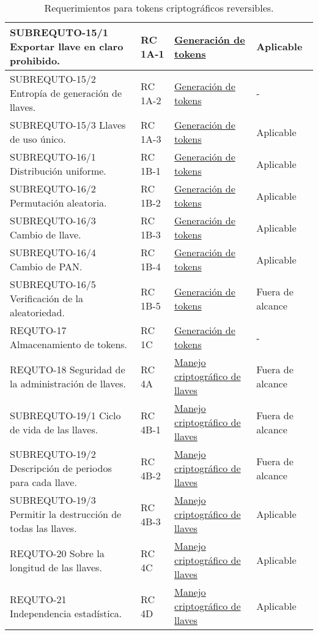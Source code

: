 \begin{table}[H]
\begin{tabular}{| p{5.5cm} | p{2cm} | p{4cm} | p{4cm} |}
    SUBREQUTO-15/1 Exportar llave en claro prohibido.  
    &  RC 1A-1  &  \hyperref[dm:gen_tokens]{Generación de tokens}              &  Aplicable        \\ \hline
    SUBREQUTO-15/2 Entropía de generación de llaves.  
    &  RC 1A-2  &  \hyperref[dm:gen_tokens]{Generación de tokens}              &  -                \\ \hline
    SUBREQUTO-15/3 Llaves de uso único.  
    &  RC 1A-3  &  \hyperref[dm:gen_tokens]{Generación de tokens}              &  Aplicable        \\ \hline
    SUBREQUTO-16/1 Distribución uniforme.  
    &  RC 1B-1  &  \hyperref[dm:gen_tokens]{Generación de tokens}              &  Aplicable        \\ \hline
    SUBREQUTO-16/2 Permutación aleatoria.  
    &  RC 1B-2  &  \hyperref[dm:gen_tokens]{Generación de tokens}              &  Aplicable        \\ \hline
    SUBREQUTO-16/3 Cambio de llave.  
    &  RC 1B-3  &  \hyperref[dm:gen_tokens]{Generación de tokens}              &  Aplicable        \\ \hline
    SUBREQUTO-16/4 Cambio de PAN.  
    &  RC 1B-4  &  \hyperref[dm:gen_tokens]{Generación de tokens}              &  Aplicable        \\ \hline
    SUBREQUTO-16/5 Verificación de la aleatoriedad.  
    &  RC 1B-5  &  \hyperref[dm:gen_tokens]{Generación de tokens}              &  Fuera de alcance \\ \hline
    REQUTO-17 Almacenamiento de tokens.  
    &  RC 1C    &  \hyperref[dm:gen_tokens]{Generación de tokens}              &  -                \\ \hline
    REQUTO-18 Seguridad de la administración de llaves.  
    &  RC 4A    &  \hyperref[dm:man_llaves]{Manejo criptográfico de llaves}    &  Fuera de alcance \\ \hline
    SUBREQUTO-19/1 Ciclo de vida de las llaves.  
    &  RC 4B-1  &  \hyperref[dm:man_llaves]{Manejo criptográfico de llaves}    &  Fuera de alcance \\ \hline
    SUBREQUTO-19/2 Descripción de periodos para cada llave.  
    &  RC 4B-2  &  \hyperref[dm:man_llaves]{Manejo criptográfico de llaves}    &  Fuera de alcance \\ \hline
    SUBREQUTO-19/3 Permitir la destrucción de todas las llaves.  
    &  RC 4B-3  &  \hyperref[dm:man_llaves]{Manejo criptográfico de llaves}    &  Aplicable        \\ \hline
    REQUTO-20 Sobre la longitud de las llaves.  
    &  RC 4C    &  \hyperref[dm:man_llaves]{Manejo criptográfico de llaves}    &  Aplicable        \\ \hline
    REQUTO-21 Independencia estadística.  
    &  RC 4D    &  \hyperref[dm:man_llaves]{Manejo criptográfico de llaves}    &  Aplicable        \\ \hline

  \end{tabular}
  \caption{Requerimientos para tokens criptográficos reversibles.}
\end{table}

